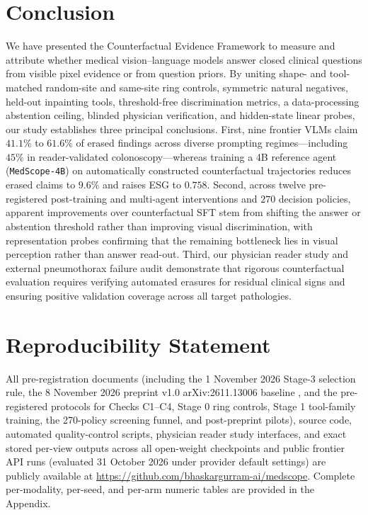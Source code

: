 \documentclass{article} %
\begin{document}
\section{Conclusion}
\label{sec:conclusion}
We have presented the Counterfactual Evidence Framework to measure and attribute whether medical vision--language models answer closed clinical questions from visible pixel evidence or from question priors. By uniting shape- and tool-matched random-site and same-site ring controls, symmetric natural negatives, held-out inpainting tools, threshold-free discrimination metrics, a data-processing abstention ceiling, blinded physician verification, and hidden-state linear probes, our study establishes three principal conclusions. First, nine frontier VLMs claim $41.1\%$ to $61.6\%$ of erased findings across diverse prompting regimes---including $45\%$ in reader-validated colonoscopy---whereas training a 4B reference agent (\texttt{MedScope-4B}) on automatically constructed counterfactual trajectories reduces erased claims to $9.6\%$ and raises ESG to $0.758$. Second, across twelve pre-registered post-training and multi-agent interventions and $270$ decision policies, apparent improvements over counterfactual SFT stem from shifting the answer or abstention threshold rather than improving visual discrimination, with representation probes confirming that the remaining bottleneck lies in visual perception rather than answer read-out. Third, our physician reader study and external pneumothorax failure audit demonstrate that rigorous counterfactual evaluation requires verifying automated erasures for residual clinical signs and ensuring positive validation coverage across all target pathologies.

\section*{Reproducibility Statement}
All pre-registration documents (including the 1 November 2026 Stage-3 selection rule, the 8 November 2026 preprint v1.0 arXiv:2611.13006 baseline \citep{gurram2026medscope}, and the pre-registered protocols for Checks C1--C4, Stage 0 ring controls, Stage 1 tool-family training, the 270-policy screening funnel, and post-preprint pilots), source code, automated quality-control scripts, physician reader study interfaces, and exact stored per-view outputs across all open-weight checkpoints and public frontier API runs (evaluated 31 October 2026 under provider default settings) are publicly available at \url{https://github.com/bhaskargurram-ai/medscope}. Complete per-modality, per-seed, and per-arm numeric tables are provided in the Appendix.
\end{document}
